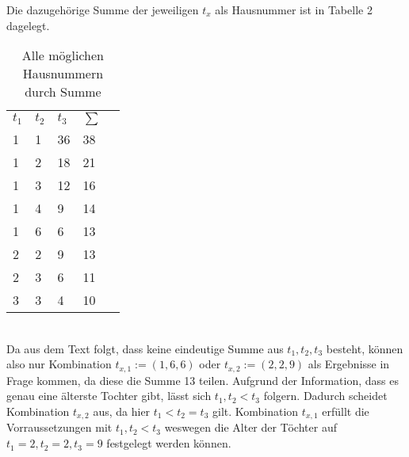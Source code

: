 \begin{aufg}[6 Punkte]
Die dazugehörige Summe der jeweiligen $t_x$ als Hausnummer ist in Tabelle 2 dagelegt.\\
\begin{table}[h]
\centering
\begin{tabular}{lllll}
$t_1$ & $t_2$ & $t_3$ & $\sum$\\
 1 & 1  & 36  & 38  \\
 1 & 2 & 18  & 21\\
 1 & 3 & 12  & 16\\
 1 & 4 & 9    & 14\\
 1 & 6 & 6  & 13 \\
 2 & 2 & 9   & 13 \\
 2 & 3 & 6   & 11 \\
 3 & 3 & 4   & 10\\
\end{tabular}
\caption{Alle möglichen Hausnummern durch Summe}
\end{table} \\
Da aus dem Text folgt, dass keine eindeutige Summe aus $t_1,t_2,t_3$ besteht, können also nur Kombination $t_{x,1}:=(1,6,6)$ oder $t_{x,2}:=(2,2,9)$ als Ergebnisse in Frage kommen, da diese die Summe 13 teilen. Aufgrund der Information, dass es genau eine älterste Tochter gibt, lässt sich $t_1,t_2 < t_3$ folgern. Dadurch scheidet Kombination $t_{x,2}$ aus, da hier $t_1 < t_2 = t_3$ gilt. Kombination $t_{x,1}$ erfüllt die Vorraussetzungen mit $ t_1,t_2<t_3$ weswegen die Alter der Töchter auf $t_1=2, t_2=2, t_3=9$ festgelegt werden können.



\end{aufg}
 
\bigskip 

\begin{lsg}
 
\end{lsg}
